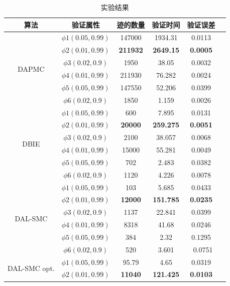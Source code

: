 \begin{table}
\caption{实验结果}
\centering
\begin{tabular}{c c c c c c} 
        \hline  
        算法 & 验证属性 & 迹的数量 & 验证时间 & 验证误差\\
        \hline
        \multirow{6}{1.5cm}{DAPMC}  
                & $\phi1(0.05,0.99)$ &  147000&  1934.31&  0.0113\\ 
                & $\phi2(0.01,0.99)$ &  \textbf{211932} &  \textbf{2649.15} &  \textbf{0.0005}\\ 
                & $\phi3(0.02,0.9)$ &  1950&     38.05& 0.0032\\ 
                & $\phi4(0.01,0.99)$ &  211930&  76.282 &  0.0024\\ 
                & $\phi5(0.05,0.99)$ &  147550&  52.206&  0.0399\\ 
                & $\phi6(0.02,0.9)$ &  1850&     1.159& 0.0026\\     
        \hline 
        \multirow{6}{1.5cm}{DBIE}  
                & $\phi1(0.05,0.99)$ &  600&  7.895&  0.0131\\ 
                & $\phi2(0.01,0.99)$ &  \textbf{20000}&  \textbf{259.275} &  \textbf{0.0051} \\ 
                & $\phi3(0.02,0.9)$ &  2100& 38.057& 0.0068\\ 
                & $\phi4(0.01,0.99)$ & 15000&  55.281 &  0.0049\\ 
                & $\phi5(0.05,0.99)$ &  702&  2.483&  0.0382\\ 
                & $\phi6(0.02,0.9)$ &  1120& 4.226& 0.0078\\      
        \hline 
        \multirow{6}{1.5cm}{DAL-SMC}  
                & $\phi1(0.05,0.99)$ &  103&  5.685&  0.0433\\ 
                & $\phi2(0.01,0.99)$ &  \textbf{12000}&  \textbf{151.785} &  \textbf{0.0235} \\ 
                & $\phi3(0.02,0.9)$ &  1137& 22.841& 0.0399\\ 
                & $\phi4(0.01,0.99)$ &  8318&  41.68 &  0.0246\\ 
                & $\phi5(0.05,0.99)$ &  384&  2.32&  0.1295\\ 
                & $\phi6(0.02,0.9)$ &  520& 3.601& \ 0.0751\\      
        \hline 
         \multirow{6}{1.5cm}{DAL-SMC opt.}  
                & $\phi1(0.05,0.99)$ &  95.79&  4.65&  0.0319\\ 
                & $\phi2(0.01,0.99)$ &  \textbf{11040}&  \textbf{121.425} &  \textbf{0.0103}\\ 

\end{tabular}
\end{table}
